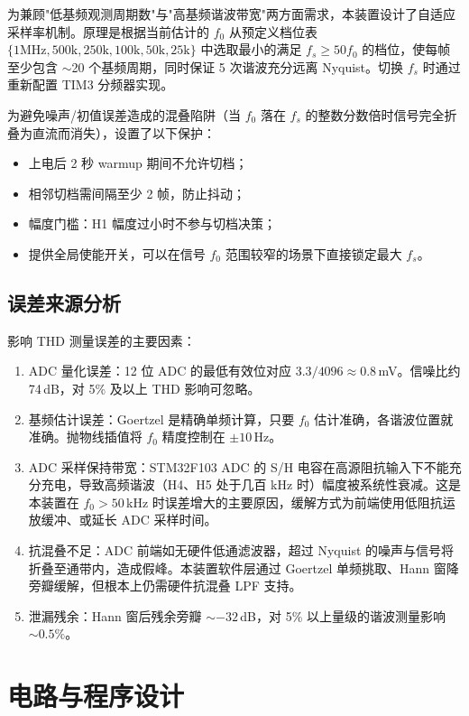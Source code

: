 \documentclass[a4paper]{article}
\begin{document}
	为兼顾"低基频观测周期数"与"高基频谐波带宽"两方面需求，本装置设计了自适应采样率机制。原理是根据当前估计的 $f_0$ 从预定义档位表 $\{1\text{MHz}, 500\text{k}, 250\text{k}, 100\text{k}, 50\text{k}, 25\text{k}\}$ 中选取最小的满足 $f_s \geq 50 f_0$ 的档位，使每帧至少包含 $\sim$20 个基频周期，同时保证 5 次谐波充分远离 Nyquist。切换 $f_s$ 时通过重新配置 TIM3 分频器实现。

	为避免噪声/初值误差造成的混叠陷阱（当 $f_0$ 落在 $f_s$ 的整数分数倍时信号完全折叠为直流而消失），设置了以下保护：
	\begin{itemize}[leftmargin=2em]
		\item 上电后 2 秒 warmup 期间不允许切档；
		\item 相邻切档需间隔至少 2 帧，防止抖动；
		\item 幅度门槛：H1 幅度过小时不参与切档决策；
		\item 提供全局使能开关，可以在信号 $f_0$ 范围较窄的场景下直接锁定最大 $f_s$。
	\end{itemize}

	\subsection{误差来源分析}

	影响 THD 测量误差的主要因素：
	\begin{enumerate}[leftmargin=2em]
		\item ADC 量化误差：12 位 ADC 的最低有效位对应 $3.3/4096 \approx 0.8$\,mV。信噪比约 74\,dB，对 5\% 及以上 THD 影响可忽略。
		\item 基频估计误差：Goertzel 是精确单频计算，只要 $f_0$ 估计准确，各谐波位置就准确。抛物线插值将 $f_0$ 精度控制在 $\pm 10$\,Hz。
		\item ADC 采样保持带宽：STM32F103 ADC 的 S/H 电容在高源阻抗输入下不能充分充电，导致高频谐波（H4、H5 处于几百 kHz 时）幅度被系统性衰减。这是本装置在 $f_0 > 50$\,kHz 时误差增大的主要原因，缓解方式为前端使用低阻抗运放缓冲、或延长 ADC 采样时间。
		\item 抗混叠不足：ADC 前端如无硬件低通滤波器，超过 Nyquist 的噪声与信号将折叠至通带内，造成假峰。本装置软件层通过 Goertzel 单频挑取、Hann 窗降旁瓣缓解，但根本上仍需硬件抗混叠 LPF 支持。
		\item 泄漏残余：Hann 窗后残余旁瓣 $\sim -32$\,dB，对 5\% 以上量级的谐波测量影响 $\sim 0.5\%$。
	\end{enumerate}


	\newpage
	\vspace{1cm}
	\section{电路与程序设计}
\end{document}
